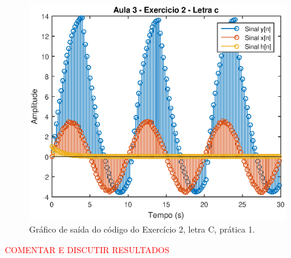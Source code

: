 \begin{figure}[!ht]
	\centering
    \includegraphics[scale = 1]{Imagens/Aula_3_exercicio2_LetraC.eps}
    \caption{Gráfico de saída do código do Exercício 2, letra C, prática 1.}
    \label{saida_ex2_pr_1_L_C}
\end{figure}

\textcolor{red}{COMENTAR E DISCUTIR RESULTADOS}